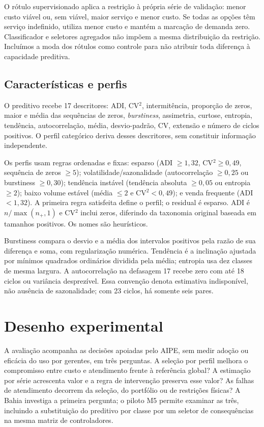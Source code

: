 \documentclass[preprint,12pt]{elsarticle}
\begin{document}
O rótulo supervisionado aplica a restrição à própria série de validação: menor custo viável ou, sem viável, maior serviço e menor custo. Se todas as opções têm serviço indefinido, utiliza menor custo e mantém a marcação de demanda zero. Classificador e seletores agregados não impõem a mesma distribuição da restrição. Incluímos a moda dos rótulos como controle para não atribuir toda diferença à capacidade preditiva.

\subsection{Características e perfis}
O preditivo recebe 17 descritores: ADI, CV$^2$, intermitência, proporção de zeros, maior e média das sequências de zeros, \textit{burstiness}, assimetria, curtose, entropia, tendência, autocorrelação, média, desvio-padrão, CV, extensão e número de ciclos positivos. O perfil categórico deriva desses descritores, sem constituir informação independente.

Os perfis usam regras ordenadas e fixas: esparso (ADI $\geq1{,}32$, CV$^2\geq0{,}49$, sequência de zeros $\geq5$); volatilidade/sazonalidade (autocorrelação $\geq0{,}25$ ou burstiness $\geq0{,}30$); tendência instável (tendência absoluta $\geq0{,}05$ ou entropia $\geq2$); baixo volume estável (média $\leq2$ e CV$^2<0{,}49$); e venda frequente (ADI $<1{,}32$). A primeira regra satisfeita define o perfil; o residual é esparso. ADI é $n/\max(n_+,1)$ e CV$^2$ inclui zeros, diferindo da taxonomia original baseada em tamanhos positivos. Os nomes são heurísticos.

Burstiness compara o desvio e a média dos intervalos positivos pela razão de sua diferença e soma, com regularização numérica. Tendência é a inclinação ajustada por mínimos quadrados ordinários dividida pela média; entropia usa dez classes de mesma largura. A autocorrelação na defasagem 17 recebe zero com até 18 ciclos ou variância desprezível. Essa convenção denota estimativa indisponível, não ausência de sazonalidade; com 23 ciclos, há somente seis pares.

\section{Desenho experimental}
A avaliação acompanha as decisões apoiadas pelo AIPE, sem medir adoção ou eficácia do uso por gerentes, em três perguntas. A seleção por perfil melhora o compromisso entre custo e atendimento frente à referência global? A estimação por série acrescenta valor e a regra de intervenção preserva esse valor? As falhas de atendimento decorrem da seleção, do portfólio ou de restrições físicas? A Bahia investiga a primeira pergunta; o piloto M5 permite examinar as três, incluindo a substituição do preditivo por classe por um seletor de consequências na mesma matriz de controladores.
\end{document}
